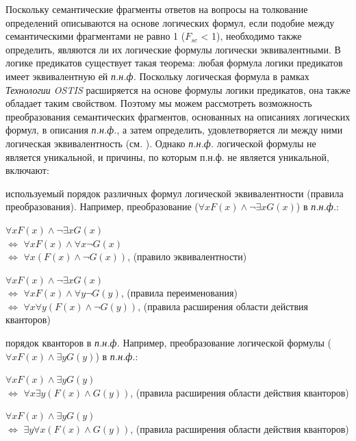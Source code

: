 Поскольку семантические фрагменты ответов на вопросы на толкование определений описываются на основе логических формул, если подобие между семантическими фрагментами не равно 1 ($F_{sc}$ < 1), необходимо также определить, являются ли их логические формулы логически эквивалентными. В логике предикатов существует такая теорема: любая формула логики предикатов имеет эквивалентную ей \textit{п.н.ф.} Поскольку логическая формула в рамках \textit{Технологии OSTIS} расширяется на основе формулы логики предикатов, она также обладает таким свойством. Поэтому мы можем рассмотреть возможность преобразования семантических фрагментов, основанных на описаниях логических формул, в описания \textit{п.н.ф.}, а затем определить, удовлетворяется ли между ними логическая эквивалентность (см. ). Однако \textit{п.н.ф.} логической формулы не является уникальной, и причины, по которым п.н.ф. не является уникальной, включают:

\begin{textitemize}
	\item используемый порядок различных формул логической эквивалентности (правила преобразования). Например, преобразование ($\forall x F(x) \land \neg \exists x G(x)$) в \textit{п.н.ф.}:
	
	\begin{textitemize}
		\item $\forall x F(x) \land \neg \exists x G(x)$ \\ $\Leftrightarrow$ $\forall x F(x) \land \forall x \neg G(x)$ \\ $\Leftrightarrow$ $\forall x (F(x) \land \neg G(x)) $, (правило эквивалентности) 
		\item $\forall x F(x) \land \neg \exists x G(x)$ \\ $\Leftrightarrow$ $\forall x F(x) \land  \forall y \neg G(y)$, (правила переименования) \\ $\Leftrightarrow$ $\forall x \forall y (F(x) \land \neg G(y)) $, (правила расширения области действия кванторов)
	\end{textitemize}
	
	\item порядок кванторов в \textit{п.н.ф.} Например, преобразование логической формулы ($\forall x F(x)\wedge \exists y G(y)$) в \textit{п.н.ф.}:
	
	\begin{textitemize}
		\item $\forall x F(x)\wedge \exists y G(y)$ \\
		$\Leftrightarrow$ $\forall x \exists y (F(x) \wedge G(y))$, (правила расширения области действия кванторов)
		\item $\forall x F(x)\wedge \exists y G(y)$ \\
		$\Leftrightarrow$ $\exists y \forall x (F(x) \wedge G(y))$, (правила расширения области действия кванторов)
	\end{textitemize}
	
\end{textitemize}

